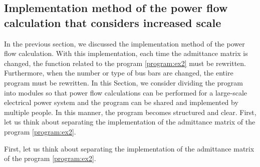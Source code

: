 \documentclass[graybox, envcountchap]{svmult}
\begin{document}
\subsection{Implementation method of the power flow calculation that considers increased scale}
In the previous section, we discussed the implementation method of the power flow calculation.
With this implementation, each time the admittance matrix is changed, the function related to the program \ref{program:ex2} must be rewritten.
Furthermore, when the number or type of bus bars are changed, the entire program must be rewritten.
In this Section, we consider dividing the program into modules so that power flow calculations can be performed for a large-scale electrical power system and the program can be shared and implemented by multiple people.
In this manner, the program becomes structured and clear.
First, let us think about separating the implementation of the admittance matrix of the program \nobreak\ref{program:ex2}.

First, let us think about separating the implementation of the admittance matrix of the program \nobreak\ref{program:ex2}.
\end{document}
